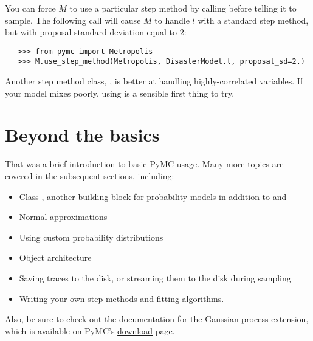 You can force $M$ to use a particular step method by calling  before telling it to sample. The following call will cause $M$ to handle $l$ with a standard  step method, but with proposal standard deviation equal to $2$:
\begin{verbatim}
   >>> from pymc import Metropolis
   >>> M.use_step_method(Metropolis, DisasterModel.l, proposal_sd=2.)
\end{verbatim}

Another step method class, , is better at handling highly-correlated variables. If your model mixes poorly, using  is a sensible first thing to try.



\section{Beyond the basics}
That was a brief introduction to basic PyMC usage. Many more topics are covered in the subsequent sections, including:
\begin{itemize}
   \item Class , another building block for probability models in addition to  and 
   \item Normal approximations
   \item Using custom probability distributions
   \item Object architecture
   \item Saving traces to the disk, or streaming them to the disk during sampling
   \item Writing your own step methods and fitting algorithms.
\end{itemize}
Also, be sure to check out the documentation for the Gaussian process extension,
which is available on PyMC's
\href{http://code.google.com/p/pymc/downloads/list}{download} page.
